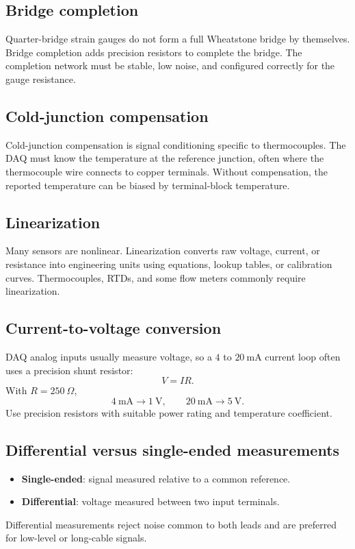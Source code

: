 \documentclass[11pt]{article}
\newcommand{\V}{\mathrm{V}}
\newcommand{\mA}{\mathrm{mA}}
\begin{document}
\subsection{Bridge completion}
Quarter-bridge strain gauges do not form a full Wheatstone bridge by themselves.
Bridge completion adds precision resistors to complete the bridge. The
completion network must be stable, low noise, and configured correctly for the
gauge resistance.

\subsection{Cold-junction compensation}
Cold-junction compensation is signal conditioning specific to thermocouples. The
DAQ must know the temperature at the reference junction, often where the
thermocouple wire connects to copper terminals. Without compensation, the
reported temperature can be biased by terminal-block temperature.

\subsection{Linearization}
Many sensors are nonlinear. Linearization converts raw voltage, current, or
resistance into engineering units using equations, lookup tables, or calibration
curves. Thermocouples, RTDs, and some flow meters commonly require
linearization.

\subsection{Current-to-voltage conversion}
DAQ analog inputs usually measure voltage, so a \(4\) to \(20~\mA\) current loop
often uses a precision shunt resistor:
\[
V = IR.
\]
With \(R=250~\Omega\),
\[
4~\mA \rightarrow 1~\V, \qquad 20~\mA \rightarrow 5~\V.
\]
Use precision resistors with suitable power rating and temperature coefficient.

\subsection{Differential versus single-ended measurements}
\begin{itemize}
  \item \textbf{Single-ended}: signal measured relative to a common reference.
  \item \textbf{Differential}: voltage measured between two input terminals.
\end{itemize}
Differential measurements reject noise common to both leads and are preferred for
low-level or long-cable signals.
\end{document}
